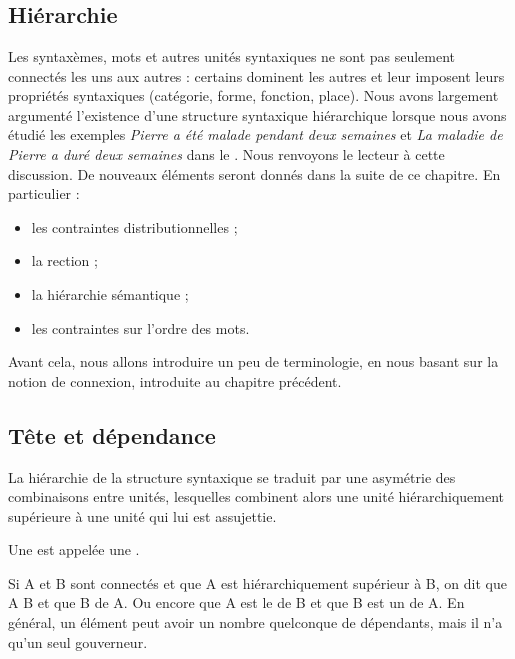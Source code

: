 \chapter{}\label{sec:3.3}

\section{Hiérarchie}\label{sec:3.3.0}
\begin{sloppypar}
Les syntaxèmes, mots et autres unités syntaxiques ne sont pas seulement connectés les uns aux autres : certains dominent les autres et leur imposent leurs propriétés syntaxiques (catégorie, forme, fonction, place). Nous avons largement argumenté l’existence d’une structure syntaxique hiérarchique lorsque nous avons étudié les exemples \textit{Pierre a été malade pendant deux semaines} et \textit{La maladie de Pierre a duré deux semaines} dans le . Nous renvoyons le lecteur à cette discussion. De nouveaux éléments seront donnés dans la suite de ce chapitre. En particulier :
\end{sloppypar}

\begin{itemize}
\item les contraintes distributionnelles ;
\item la rection ;
\item la hiérarchie sémantique ;
\item les contraintes sur l’ordre des mots.
\end{itemize}

Avant cela, nous allons introduire un peu de terminologie, en nous basant sur la notion de connexion, introduite au chapitre précédent.

\section{Tête et dépendance}\label{sec:3.3.1}

La hiérarchie de la structure syntaxique se traduit par une asymétrie des combinaisons entre unités, lesquelles combinent alors une unité hiérarchiquement supérieure à une unité qui lui est assujettie.

{Une  est appelée une .}

{Si A et B sont connectés et que A est hiérarchiquement supérieur à B, on dit que A  B et que B  de A. Ou encore que A est le  de B et que B est un  de A. En général, un élément peut avoir un nombre quelconque de dépendants, mais il n’a qu’un seul gouverneur.}

